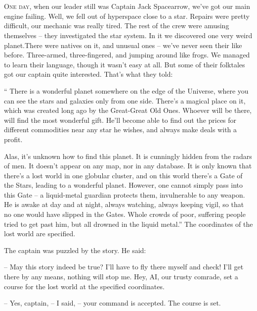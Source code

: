 \documentclass[ebook,oneside,final,openright]{memoir}
\begin{document}
\chapter{}
\par
\lettrine{O}{ne day,} when our leader still was Captain Jack Spacearrow, we’ve got our main engine failing. Well, we fell out of hyperspace close to a star. Repairs were pretty difficult, our mechanic was really tired. The rest of the crew were amusing themselves – they investigated the star system. In it we discovered one very weird planet.There were natives on it, and unusual ones – we’ve never seen their like before. Three-armed, three-fingered, and jumping around like frogs. We managed to learn their language, though it wasn’t easy at all. But some of their folktales got our captain quite interested. That’s what they told:\par
\par
“ There is a wonderful planet somewhere on the edge of the Universe, where you can see the stars and galaxies only from one side. There’s a magical place on it, which was created long ago by the Great-Great Old Ones. Whoever will be there, will find the most wonderful gift. He’ll become able to find out the prices for different commodities near any star he wishes, and always make deals with a profit. \par
Alas, it’s unknown how to find this planet. It is cunningly hidden from the radars of men. It doesn’t appear on any map, nor in any database. It is only known that there’s a lost world in one globular cluster, and on this world there’s a Gate of the Stars, leading to a wonderful planet. However, one cannot simply pass into this Gate – a liquid-metal guardian protects them, invulnerable to any weapon. He is awake at day and at night, always watching, always keeping vigil, so that no one would have slipped in the Gates. Whole crowds of poor, suffering people tried to get past him, but all drowned in the liquid metal.” The coordinates of the lost world are specified.\par
\par
The captain was puzzled by the story. He said:\par
– May this story indeed be true? I’ll have to fly there myself and check! I’ll get there by any means, nothing will stop me. Hey, AI, our trusty comrade, set a course for the lost world at the specified coordinates.\par
– Yes, captain, – I said, – your command is accepted. The course is set.\par
\end{document}
